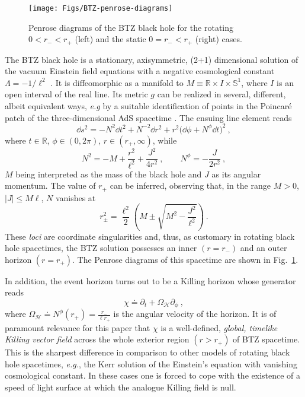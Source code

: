 \documentclass[aps, prd, amsmath, floats, floatfix, twocolumn, nofootinbib, superscriptaddress, showpacs]{revtex4-1}
\def\bR{{\mathbb R}}
\begin{document}
\begin{figure}[t]
\begin{center}
\texttt{[image: Figs/BTZ-penrose-diagrams]}
\end{center}
\caption[Penrose diagrams of the BTZ.]{\label{fig:CPdiagrams} Penrose diagrams of the BTZ black hole for the rotating $0<r_-<r_+$ (left) and the static $0=r_-<r_+$ (right) cases.}
\end{figure}



The BTZ black hole is a stationary, axisymmetric, (2+1) dimensional solution of the vacuum Einstein field equations with a negative cosmological constant $\Lambda=-1/\ell^2$ \cite{Banados:1992gq,Banados:1992wn}. It is diffeomorphic as a manifold to $M\equiv\bR\times I\times\mathbb{S}^1$, where $I$ is an open interval of the real line. Its metric $g$ can be realized in several, different, albeit equivalent ways, {\it e.g} by a suitable identification of points in the Poincar\'e patch of the three-dimensional AdS spacetime \cite{Banados:1992gq}. The ensuing line element reads
%
\begin{equation}\label{metric}
\dd s^2 = -N^2 \dd t^2 + N^{-2} \dd r^2 + r^2 \big(\dd\phi+ N^{\phi} \dd t \big)^2 \ ,
\end{equation}
%
where $t\in\mathbb{R}$, $\phi\in(0,2\pi)$, $r\in(r_+,\infty)$, while 
\begin{equation}\label{eq:metric_functions}
N^2 = -M+\frac{r^2}{\ell^2}+\frac{J^2}{4r^2} \ , \qquad N^\phi = -\frac{J}{2r^2} \ ,
\end{equation} 
%
$M$ being interpreted as the mass of the black hole and $J$ as its angular momentum.  The value of $r_+$ can be inferred, observing that, in the range $M>0$, $|J|\le M\ell$, $N$ vanishes at
%
\begin{equation}
r^2_{\pm}=
\frac{\ell^2}{2}
\left(
M \pm \sqrt{M^2-\frac{J^2}{\ell^2}}
\right) \ .
\end{equation}
These \textit{loci} are coordinate singularities and, thus, as customary in rotating black hole spacetimes, the BTZ solution possesses an inner $(r=r_-)$ and an outer horizon $(r=r_+)$. The Penrose diagrams of this spacetime are shown in Fig.~\ref{fig:CPdiagrams}. 

In addition, the event horizon turns out to be a Killing horizon whose generator reads
%
\begin{equation}\label{eq:Killing_Field}
\chi \doteq \partial_t +\Omega_{\mathcal{H}} \partial_\phi \ ,
\end{equation}
%
where $\Omega_{\mathcal{H}} \doteq N^\phi(r_{+}) = \frac{r_{-}}{\ell
r_{+}}$ is the angular velocity of the horizon. It is of paramount
relevance for this paper that $\chi$ is a
well-defined, {\em global, timelike Killing vector field} across the
whole exterior region $(r>r_+)$ of BTZ spacetime. This is the
sharpest difference in comparison to other models of rotating black hole
spacetimes, {\it e.g.}, the Kerr solution of the Einstein's equation
with vanishing cosmological constant. In these cases one is forced to
cope with the existence of a speed of light surface at which the
analogue Killing field is null.
\end{document}
